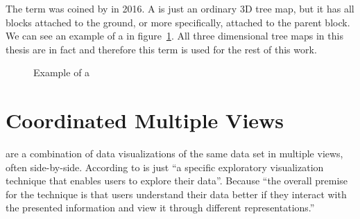 The term \tmap{} was coined by \textcite{Limberger2016} in 2016.
A \tmap{} is just an ordinary 3D tree map, but it has all blocks attached to the ground, or more specifically, attached to the parent block.
We can see an example of a \tmap{} in figure~\ref{fig:research:ua_treemap}.
All three dimensional tree maps in this thesis are in fact \tmaps{} and therefore this term is used for the rest of this work.

\begin{figure}[ht]
  \centering
  \caption{Example of a \tmap{}}
  \label{fig:research:ua_treemap}
\end{figure}


\section{Coordinated Multiple Views}\label{sec:related-work:cmvs}
\cmvs{} are a combination of data visualizations of the same data set in multiple views, often side-by-side.
According to \textcite{Roberts2007} \cmvs{} is just ``a specific exploratory visualization technique that enables users to explore their data''.
Because ``the overall premise for the technique is that users understand their data better if they interact with the presented information and view it through different representations.''~\cite{Roberts2007}

